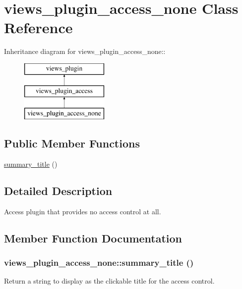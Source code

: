 \hypertarget{classviews__plugin__access__none}{
\section{views\_\-plugin\_\-access\_\-none Class Reference}
\label{classviews__plugin__access__none}
}
Inheritance diagram for views\_\-plugin\_\-access\_\-none::\begin{figure}[H]
\begin{center}
\leavevmode
\includegraphics[height=3cm]{classviews__plugin__access__none}
\end{center}
\end{figure}
\subsection*{Public Member Functions}
\begin{DoxyCompactItemize}
\item 
\hyperlink{classviews__plugin__access__none_ab76847f19e943e463cbc2ff1723bdb00}{summary\_\-title} ()
\end{DoxyCompactItemize}


\subsection{Detailed Description}
Access plugin that provides no access control at all. 

\subsection{Member Function Documentation}
\hypertarget{classviews__plugin__access__none_ab76847f19e943e463cbc2ff1723bdb00}{
\subsubsection[{summary\_\-title}]{\setlength{\rightskip}{0pt plus 5cm}views\_\-plugin\_\-access\_\-none::summary\_\-title ()}}
\label{classviews__plugin__access__none_ab76847f19e943e463cbc2ff1723bdb00}
Return a string to display as the clickable title for the access control. 

